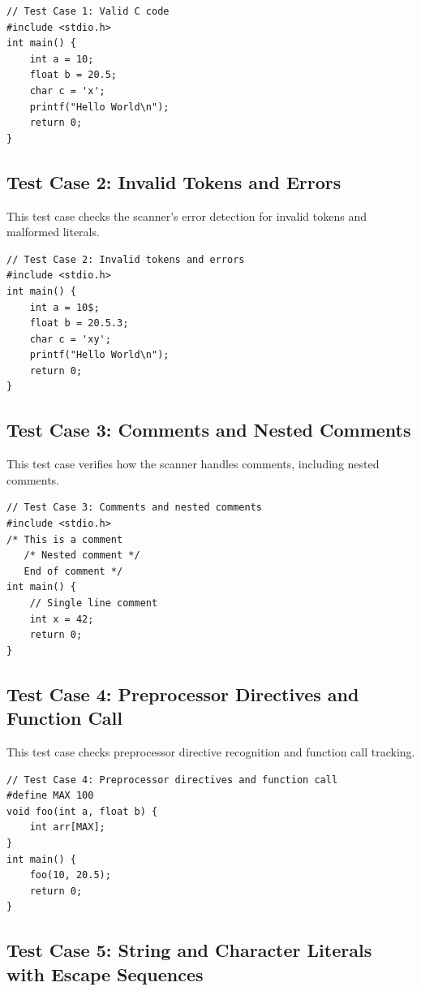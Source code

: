 \documentclass[12pt]{article}
\begin{document}
\begin{verbatim}
// Test Case 1: Valid C code
#include <stdio.h>
int main() {
    int a = 10;
    float b = 20.5;
    char c = 'x';
    printf("Hello World\n");
    return 0;
}
\end{verbatim}

\subsection{Test Case 2: Invalid Tokens and Errors}

This test case checks the scanner's error detection for invalid tokens and malformed literals.

\begin{verbatim}
// Test Case 2: Invalid tokens and errors
#include <stdio.h>
int main() {
    int a = 10$;
    float b = 20.5.3;
    char c = 'xy';
    printf("Hello World\n");
    return 0;
}
\end{verbatim}

\subsection{Test Case 3: Comments and Nested Comments}

This test case verifies how the scanner handles comments, including nested comments.

\begin{verbatim}
// Test Case 3: Comments and nested comments
#include <stdio.h>
/* This is a comment
   /* Nested comment */
   End of comment */
int main() {
    // Single line comment
    int x = 42;
    return 0;
}
\end{verbatim}

\subsection{Test Case 4: Preprocessor Directives and Function Call}

This test case checks preprocessor directive recognition and function call tracking.

\begin{verbatim}
// Test Case 4: Preprocessor directives and function call
#define MAX 100
void foo(int a, float b) {
    int arr[MAX];
}
int main() {
    foo(10, 20.5);
    return 0;
}
\end{verbatim}

\subsection{Test Case 5: String and Character Literals with Escape Sequences}
\end{document}
